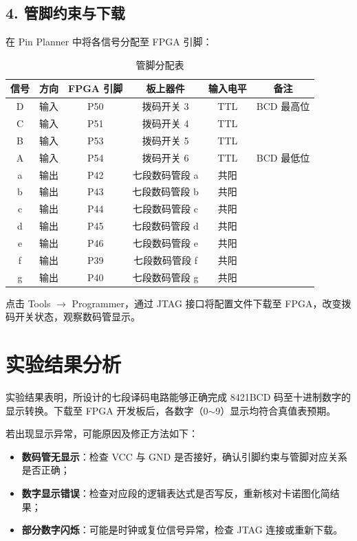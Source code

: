 \documentclass[12pt, a4paper]{article}
\begin{document}
\subsection{4. 管脚约束与下载}

在 Pin Planner 中将各信号分配至 FPGA 引脚：

\begin{table}[H]
\centering
\caption{管脚分配表}
\vspace{2mm}
\begin{tabular}{|c|c|c|c|c|c|}
\hline
信号 & 方向 & FPGA 引脚 & 板上器件 & 输入电平 & 备注 \\
\hline
D & 输入 & P50 & 拨码开关 3 & TTL & BCD 最高位 \\
\hline
C & 输入 & P51 & 拨码开关 4 & TTL & \\
\hline
B & 输入 & P53 & 拨码开关 5 & TTL & \\
\hline
A & 输入 & P54 & 拨码开关 6 & TTL & BCD 最低位 \\
\hline
a & 输出 & P42 & 七段数码管段 a & 共阳 & \\
\hline
b & 输出 & P43 & 七段数码管段 b & 共阳 & \\
\hline
c & 输出 & P44 & 七段数码管段 c & 共阳 & \\
\hline
d & 输出 & P45 & 七段数码管段 d & 共阳 & \\
\hline
e & 输出 & P46 & 七段数码管段 e & 共阳 & \\
\hline
f & 输出 & P39 & 七段数码管段 f & 共阳 & \\
\hline
g & 输出 & P40 & 七段数码管段 g & 共阳 & \\
\hline
\end{tabular}
\end{table}

点击 Tools $\rightarrow$ Programmer，通过 JTAG 接口将配置文件下载至 FPGA，改变拨码开关状态，观察数码管显示。

\section*{实验结果分析}

实验结果表明，所设计的七段译码电路能够正确完成 8421BCD 码至十进制数字的显示转换。下载至 FPGA 开发板后，各数字（0$\sim$9）显示均符合真值表预期。

若出现显示异常，可能原因及修正方法如下：

\begin{itemize}
\item \textbf{数码管无显示}：检查 VCC 与 GND 是否接好，确认引脚约束与管脚对应关系是否正确；
\item \textbf{数字显示错误}：检查对应段的逻辑表达式是否写反，重新核对卡诺图化简结果；
\item \textbf{部分数字闪烁}：可能是时钟或复位信号异常，检查 JTAG 连接或重新下载。
\end{itemize}
\end{document}
